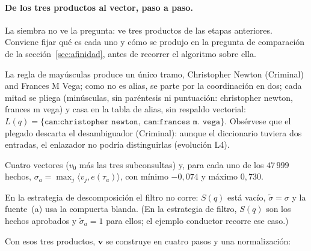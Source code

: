 \documentclass[11pt,a4paper]{article}
\begin{document}
\paragraph{De los tres productos al vector, paso a paso.}
La siembra no ve la pregunta: ve tres productos de las etapas anteriores.
Conviene fijar qué es cada uno y cómo se produjo en la pregunta de
comparación de la sección~\ref{sec:afinidad}, antes de recorrer el
algoritmo sobre ella.
\begin{description}[leftmargin=1.6em, itemsep=1pt, style=unboxed]
\item[P1, del enlazador (\S\ref{sec:linker}): $L(q)$.] La regla de
  mayúsculas produce un único tramo, \guillemotleft{}Christopher Newton (Criminal)
  and Frances M Vega\guillemotright{}; como no es alias, se parte por la coordinación
  en dos; cada mitad se pliega (minúsculas, sin paréntesis ni
  puntuación: \guillemotleft{}christopher newton\guillemotright{}, \guillemotleft{}frances m vega\guillemotright{}) y casa en
  la tabla de alias, sin respaldo vectorial:
  $L(q)=\{\texttt{can:christopher newton},\ \texttt{can:frances m.
  vega}\}$. Obsérvese que el plegado descarta el desambiguador
  \guillemotleft{}(Criminal)\guillemotright{}: aunque el diccionario tuviera dos entradas, el
  enlazador no podría distinguirlas (evolución L4).
\item[P2, de la afinidad (\S\ref{sec:afinidad}): $\{v_j\}$ y $\sigma$.]
  Cuatro vectores ($v_0$ más las tres subconsultas) y, para cada uno de
  los $47\,999$ hechos, $\sigma_a=\max_j\langle v_j,e(\tau_a)\rangle$,
  con mínimo $-0{,}074$ y máximo $0{,}730$.
\item[P3, del filtro (\S\ref{sec:filtro}): $S(q)$ y $\tilde\sigma$.] En
  la estrategia de descomposición el filtro no corre: $S(q)$ está vacío,
  $\tilde\sigma=\sigma$ y la fuente~(a) usa la compuerta blanda. (En la
  estrategia de filtro, $S(q)$ son los hechos aprobados y
  $\tilde\sigma_a=1$ para ellos; el ejemplo conductor recorre ese caso.)
\end{description}
Con esos tres productos, $\mathbf{v}$ se construye en cuatro pasos y una
normalización:
\end{document}

